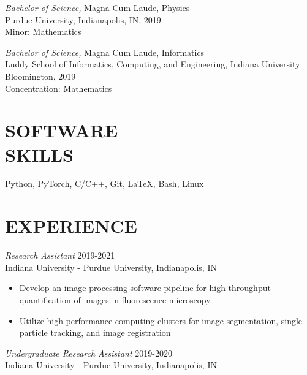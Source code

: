 \documentclass[margin, 10pt]{res} %
\begin{document}
\begin{resume}
{\sl Bachelor of Science,} Magna Cum Laude, Physics \\
Purdue University, Indianapolis, IN, 2019\\
Minor: Mathematics 

{\sl Bachelor of Science,} Magna Cum Laude, Informatics \\
Luddy School of Informatics, Computing, and Engineering, Indiana University Bloomington, 2019\\
Concentration: Mathematics 
 


\section{SOFTWARE \\ SKILLS} 

Python, PyTorch, C/C++, Git, LaTeX, Bash, Linux\\
 
 
\section{EXPERIENCE}

{\sl Research Assistant} \hfill 2019-2021 \\
Indiana University - Purdue University, Indianapolis, IN

\begin{itemize} \itemsep -2pt %

\item Develop an image processing software pipeline for high-throughput quantification of images in fluorescence microscopy

\item Utilize high performance computing clusters for image segmentation, single particle tracking, and image registration
 
\end{itemize}
 
{\sl Undergraduate Research Assistant} \hfill 2019-2020\\
Indiana University - Purdue University, Indianapolis, IN
\begin{itemize} \itemsep -2pt %


\end{itemize}
\end{resume}
\end{document}
